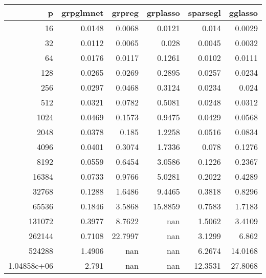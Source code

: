 \begin{tabular}{rrrrrr}
\hline
                p &   grpglmnet &   grpreg &   grplasso &   sparsegl &   gglasso \\
\hline
     16           &      0.0148 &   0.0068 &     0.0121 &     0.014  &    0.0029 \\
     32           &      0.0112 &   0.0065 &     0.028  &     0.0045 &    0.0032 \\
     64           &      0.0176 &   0.0117 &     0.1261 &     0.0102 &    0.0111 \\
    128           &      0.0265 &   0.0269 &     0.2895 &     0.0257 &    0.0234 \\
    256           &      0.0297 &   0.0468 &     0.3124 &     0.0234 &    0.024  \\
    512           &      0.0321 &   0.0782 &     0.5081 &     0.0248 &    0.0312 \\
   1024           &      0.0469 &   0.1573 &     0.9475 &     0.0429 &    0.0568 \\
   2048           &      0.0378 &   0.185  &     1.2258 &     0.0516 &    0.0834 \\
   4096           &      0.0401 &   0.3074 &     1.7336 &     0.078  &    0.1276 \\
   8192           &      0.0559 &   0.6454 &     3.0586 &     0.1226 &    0.2367 \\
  16384           &      0.0733 &   0.9766 &     5.0281 &     0.2022 &    0.4289 \\
  32768           &      0.1288 &   1.6486 &     9.4465 &     0.3818 &    0.8296 \\
  65536           &      0.1846 &   3.5868 &    15.8859 &     0.7583 &    1.7183 \\
 131072           &      0.3977 &   8.7622 &   nan      &     1.5062 &    3.4109 \\
 262144           &      0.7108 &  22.7997 &   nan      &     3.1299 &    6.862  \\
 524288           &      1.4906 & nan      &   nan      &     6.2674 &   14.0168 \\
      1.04858e+06 &      2.791  & nan      &   nan      &    12.3531 &   27.8068 \\
\hline
\end{tabular}